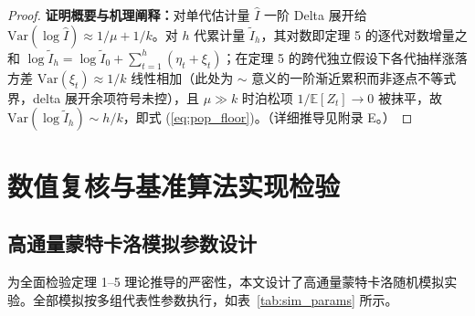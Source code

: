 \documentclass[11pt,a4paper]{article}
\theoremstyle{plain}
\theoremstyle{definition}
\begin{document}
\begin{proof}
\textbf{证明概要与机理阐释：}对单代估计量 $\hat{I}$ 一阶 Delta 展开给 $\text{Var}(\log\hat{I}) \approx 1/\mu + 1/k$。对 $h$ 代累计量 $\tilde{I}_h$，其对数即定理 5 的逐代对数增量之和 $\log\tilde{I}_h = \log \tilde{I}_0 + \sum_{t=1}^{h}(\eta_t + \xi_t)$；在定理 5 的跨代独立假设下各代抽样涨落方差 $\text{Var}(\xi_t)\approx 1/k$ 线性相加（此处为 $\sim$ 意义的一阶渐近累积而非逐点不等式界，delta 展开余项符号未控），且 $\mu \gg k$ 时泊松项 $1/\mathbb{E}[Z_t] \to 0$ 被抹平，故 $\text{Var}(\log\tilde{I}_h) \sim h/k$，即式 (\ref{eq:pop_floor})。（详细推导见附录 E。）
\end{proof}

\section{数值复核与基准算法实现检验}\label{sec:simulation}

\subsection{高通量蒙特卡洛模拟参数设计}

为全面检验定理 1--5 理论推导的严密性，本文设计了高通量蒙特卡洛随机模拟实验。全部模拟按多组代表性参数执行，如表~\ref{tab:sim_params} 所示。
\end{document}
